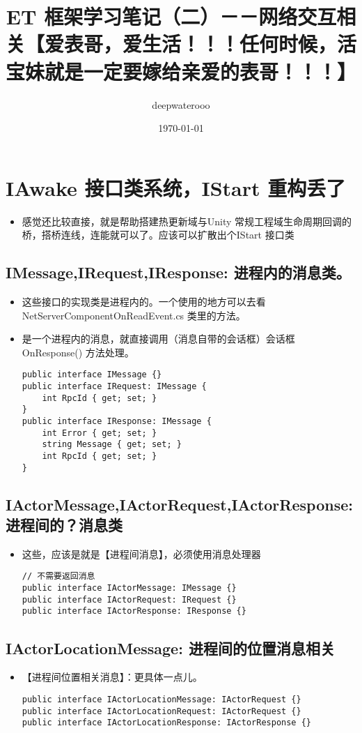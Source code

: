 \documentclass[9pt, b5paper]{article}
\author{deepwaterooo}
\date{\today}
\title{ET 框架学习笔记（二）－－网络交互相关【爱表哥，爱生活！！！任何时候，活宝妹就是一定要嫁给亲爱的表哥！！！】}
\begin{document}
\maketitle
\tableofcontents


\section{IAwake 接口类系统，IStart 重构丢了}
\label{sec-1}
\begin{itemize}
\item 感觉还比较直接，就是帮助搭建热更新域与Unity 常规工程域生命周期回调的桥，搭桥连线，连能就可以了。应该可以扩散出个IStart 接口类
\end{itemize}
\subsection{IMessage,IRequest,IResponse: 进程内的消息类。}
\label{sec-1-1}
\begin{itemize}
\item 这些接口的实现类是进程内的。一个使用的地方可以去看 NetServerComponentOnReadEvent.cs 类里的方法。
\item 是一个进程内的消息，就直接调用（消息自带的会话框）会话框 OnResponse() 方法处理。
\begin{verbatim}
public interface IMessage {}
public interface IRequest: IMessage {
    int RpcId { get; set; }
}
public interface IResponse: IMessage {
    int Error { get; set; }
    string Message { get; set; }
    int RpcId { get; set; }
}
\end{verbatim}
\end{itemize}
\subsection{IActorMessage,IActorRequest,IActorResponse: 进程间的？消息类}
\label{sec-1-2}
\begin{itemize}
\item 这些，应该是就是【进程间消息】，必须使用消息处理器
\begin{verbatim}
// 不需要返回消息
public interface IActorMessage: IMessage {}
public interface IActorRequest: IRequest {}
public interface IActorResponse: IResponse {}
\end{verbatim}
\end{itemize}
\subsection{IActorLocationMessage: 进程间的位置消息相关}
\label{sec-1-3}
\begin{itemize}
\item 【进程间位置相关消息】：更具体一点儿。
\begin{verbatim}
public interface IActorLocationMessage: IActorRequest {}
public interface IActorLocationRequest: IActorRequest {}
public interface IActorLocationResponse: IActorResponse {}
\end{verbatim}
\end{itemize}
\end{document}
